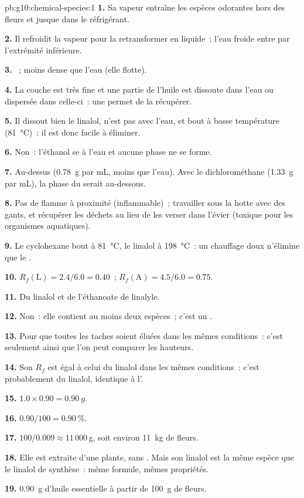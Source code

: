 \begin{solution}{pb:g10:chemical-species:1}
\textbf{1.} Sa vapeur entraîne les espèces odorantes hors des fleurs et
jusque dans le réfrigérant.

\textbf{2.} Il refroidit la vapeur pour la retransformer en liquide~;
l'eau froide entre par l'extrémité inférieure.

\textbf{3.} ~; moins dense que l'eau (elle flotte).

\textbf{4.} La couche est très fine et une partie de l'huile est dissoute
dans l'eau ou dispersée dans celle-ci~: une  permet de la
récupérer.

\textbf{5.} Il dissout bien le linalol, n'est pas  avec l'eau, et
bout à basse température (\qty{81}{\celsius})~: il est donc facile à
éliminer.

\textbf{6.} Non~: l'éthanol se  à l'eau et aucune phase ne se
forme.

\textbf{7.} Au-dessus (\qty{0.78}{g} par mL, moins que l'eau). Avec le
dichlorométhane (\qty{1.33}{g} par mL), la phase du  serait
au-dessous.

\textbf{8.} Pas de flamme à proximité (inflammable)~; travailler sous la
hotte avec des gants, et récupérer les déchets au lieu de les verser dans
l'évier (toxique pour les organismes aquatiques).

\textbf{9.} Le cyclohexane bout à \qty{81}{\celsius}, le linalol à
\qty{198}{\celsius}~: un chauffage doux n'élimine que le .

\textbf{10.} $R_f(\text{L}) = 2.4/6.0 = 0.40$~; $R_f(\text{A}) = 4.5/6.0
= 0.75$.

\textbf{11.} Du linalol et de l'éthanoate de linalyle.

\textbf{12.} Non~: elle contient au moins deux espèces~; c'est un
.

\textbf{13.} Pour que toutes les taches soient éluées dans les mêmes
conditions~: c'est seulement ainsi que l'on peut comparer les hauteurs.

\textbf{14.} Son $R_f$ est égal à celui du linalol dans les mêmes
conditions~: c'est probablement du linalol, identique à l'.

\textbf{15.} $1.0 \times 0.90 = \qty{0.90}{g}$.

\textbf{16.} $0.90/100 = \qty{0.90}{\percent}$.

\textbf{17.} $100/0.009 \approx 11\,000$\,g, soit environ \qty{11}{kg}
de fleurs.

\textbf{18.} Elle est extraite d'une plante, sans . Mais son linalol est la même espèce que le linalol de
synthèse~: même formule, mêmes propriétés.

\textbf{19.} \qty{0.90}{g} d'huile essentielle à partir de \qty{100}{g}
de fleurs.
\end{solution}
